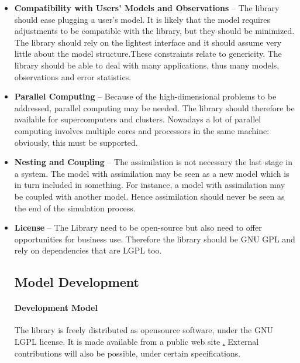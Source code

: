 \documentclass{tufte-book}
\begin{document}
\begin{itemize}
\item \textbf{Compatibility with Users' Models and Observations} -- The library should ease plugging a user's model. It is likely that the model
requires adjustments to be compatible with the library, but they should be
minimized. The library should rely on the lightest interface and it should
assume very little about the model structure.These constraints relate to genericity. The library should be able to deal
with many applications, thus many models, observations and error statistics.

\item \textbf{Parallel Computing} -- Because of the high-dimensional problems to be addressed, parallel computing
may be needed. The library should therefore be available for supercomputers
and clusters. Nowadays a lot of parallel computing involves multiple cores and
processors in the same machine: obviously, this must be supported.

\item \textbf{Nesting and Coupling} -- The assimilation is not necessary the last stage in a system. The model with
assimilation may be seen as a new model which is in turn included in
something. For instance, a model with assimilation may be coupled with another model. Hence
assimilation should never be seen as the end of the simulation process.

\item \textbf{License} -- The Library need to be open-source but also need to offer opportunities for business use. Therefore the library should be GNU GPL and rely on dependencies that are LGPL too.


\subsection{Model Development}




\paragraph{Development Model}
The library is freely distributed as opensource software, under the GNU LGPL license. It is made available from a public web site \href{http://verdandi.gforge.inria.fr/}. External contributions will also be possible, under certain specifications.%



\end{itemize}
\end{document}
